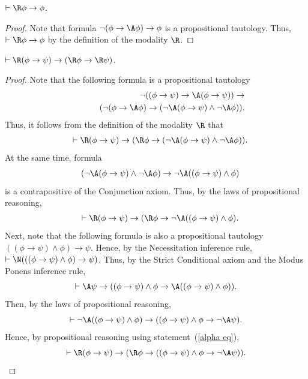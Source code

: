 \documentclass[letterpaper]{article}
\begin{document}
\begin{lemma}\label{truth axiom for R}
$\vdash\R\phi\to\phi$.
\end{lemma}
\begin{proof}
Note that formula $\neg(\phi\to\A\phi)\to\phi$ is a propositional tautology. Thus, $\vdash \R\phi\to\phi$ by the definition of the modality $\R$.
\end{proof}

\begin{lemma}\label{K axiom for R}
$\vdash\R(\phi\to\psi)\to(\R\phi\to\R\psi)$.
\end{lemma}
\begin{proof}
Note that the following formula is a propositional tautology
\begin{eqnarray*}
&&\neg((\phi\to\psi)\to\A(\phi\to\psi))\to\\
&&\hspace{10mm}(\neg(\phi\to\A\phi) \to (\neg\A(\phi\to\psi) \wedge \neg\A\phi)).
\end{eqnarray*}
Thus, it follows from the definition of the modality $\R$ that 
\begin{eqnarray*}
&&\vdash \R(\phi\to\psi)\to(\R\phi \to (\neg\A(\phi\to\psi) \wedge \neg\A\phi)).
\end{eqnarray*}
At the same time, formula 
\begin{eqnarray*}
&&(\neg\A(\phi\to\psi) \wedge \neg\A\phi)\to \neg\A((\phi\to\psi)\wedge\phi) 
\end{eqnarray*}
is a contrapositive of the Conjunction axiom. Thus, by the laws of propositional reasoning,
\begin{eqnarray}\label{alpha eq}
&&\vdash \R(\phi\to\psi)\to(\R\phi \to \neg\A((\phi\to\psi)\wedge\phi).
\end{eqnarray}
Next, note that the following formula is also a propositional tautology
$
((\phi\to\psi)\wedge\phi)\to\psi
$.
Hence, by the Necessitation inference rule,
$
\vdash\N(((\phi\to\psi)\wedge\phi)\to\psi)
$.
Thus, by the Strict Conditional axiom and the Modus Ponens inference rule,
$$
\vdash\A\psi\to  ((\phi\to\psi)\wedge\phi\to\A((\phi\to\psi)\wedge \phi)).
$$
Then, by the laws of propositional reasoning,
$$
\vdash\neg\A((\phi\to\psi)\wedge \phi)\to ((\phi\to\psi)\wedge \phi\to\neg\A\psi).
$$
Hence, by propositional reasoning using statement~(\ref{alpha eq}),
\begin{equation}\label{beta equation}
\vdash \R(\phi\to\psi)\to(\R\phi \to ((\phi\to\psi)\wedge \phi\to\neg\A\psi)).    
\end{equation}

\end{proof}
\end{document}

